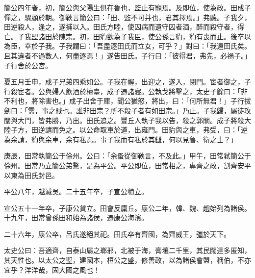 \begin{pinyinscope}
簡公四年春，初，簡公與父陽生俱在魯也，監止有寵焉。及即位，使為政。田成子憚之，驟顧於朝。御鞅言簡公曰：「田、監不可并也，君其擇焉。」弗聽。子我夕，田逆殺人，逢之，遂捕以入。田氏方睦，使囚病而遺守囚者酒，醉而殺守者，得亡。子我盟諸田於陳宗。初，田豹欲為子我臣，使公孫言豹，豹有喪而止。後卒以為臣，幸於子我。子我謂曰：「吾盡逐田氏而立女，可乎？」對曰：「我遠田氏矣。且其違者不過數人，何盡逐焉！」遂告田氏。子行曰：「彼得君，弗先，必禍子。」子行舍於公宮。

夏五月壬申，成子兄弟四乘如公。子我在幄，出迎之，遂入，閉門。宦者御之，子行殺宦者。公與婦人飲酒於檀臺，成子遷諸寢。公執戈將擊之，太史子餘曰：「非不利也，將除害也。」成子出舍于庫，聞公猶怒，將出，曰：「何所無君！」子行拔劍曰：「需，事之賊也。誰非田宗？所不殺子者有如田宗。」乃止。子我歸，屬徒攻闈與大門，皆弗勝，乃出。田氏追之。豐丘人執子我以告，殺之郭關。成子將殺大陸子方，田逆請而免之。以公命取車於道，出雍門。田豹與之車，弗受，曰：「逆為余請，豹與余車，余有私焉。事子我而有私於其讎，何以見魯、衛之士？」

庚辰，田常執簡公于俆州。公曰：「余蚤從御鞅言，不及此。」甲午，田常弒簡公于俆州。田常乃立簡公弟驁，是為平公。平公即位，田常相之，專齊之政，割齊安平以東為田氏封邑。

平公八年，越滅吳。二十五年卒，子宣公積立。

宣公五十一年卒，子康公貸立。田會反廩丘。康公二年，韓、魏、趙始列為諸侯。十九年，田常曾孫田和始為諸侯，遷康公海濱。

二十六年，康公卒，呂氏遂絕其祀。田氏卒有齊國，為齊威王，彊於天下。

太史公曰：吾適齊，自泰山屬之瑯邪，北被于海，膏壤二千里，其民闊達多匿知，其天性也。以太公之聖，建國本，桓公之盛，修善政，以為諸侯會盟，稱伯，不亦宜乎？洋洋哉，固大國之風也！


\end{pinyinscope}